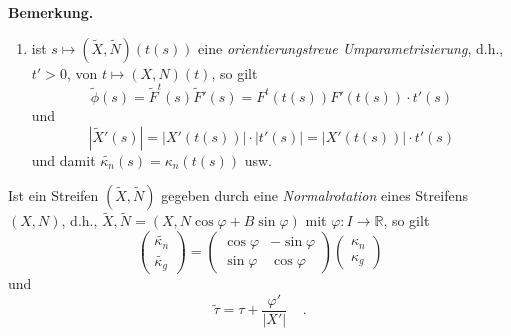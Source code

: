 \documentclass[a4paper,oneside,11pt,DIV=12,parskip=half]{scrartcl}
\newcommand{\R}{\mathbb R}
\newenvironment{note}{\textbf{Bemerkung.} ~~~~}{}
\newenvironment{lemma, definition}{\textbf{Lemma und Definition.} ~~~~}{}
\newenvironment{note, example}{\textbf{Bemerkung und Beispiel.} ~~~~}{}
\newenvironment{note, definition}{\textbf{Bemerkung und Definition.} ~~~~}{}
\begin{document}
\begin{lemma, definition}
\begin{note}
\begin{enumerate}
		\item ist $s \mapsto (\widetilde{X}, \widetilde{N})(t(s))$ eine \textit{orientierungstreue Umparametrisierung}, d.h., $t' >0$, von $t \mapsto (X,N)(t)$, so gilt
		\[\widetilde{\phi}(s) = \widetilde{F}^t(s)\widetilde{F}'(s) = F^t(t(s))F'(t(s))\cdot t'(s) \] und \[ |\widetilde{X}'(s)| = |X'(t(s))|\cdot|t'(s)| =  |X'(t(s))|\cdot t'(s) \] und damit $\widetilde{\kappa_n}(s)= \kappa_n(t(s))$ usw.
	\end{enumerate}
\end{note}

\begin{note, definition}
	Ist ein Streifen $(\widetilde{X},\widetilde{N})$ gegeben durch eine \textit{Normalrotation} eines Streifens $(X,N)$, d.h., $\widetilde{X}, \widetilde{N} = (X,N \cos \varphi + B \sin \varphi)$ mit $\varphi: I \rightarrow \R$, so gilt
	\begin{equation*}
	\begin{pmatrix} 
		\widetilde{\kappa_n}\\
		\widetilde{\kappa_g}
	\end{pmatrix}
	=
	 \begin{pmatrix} 
	 \cos \varphi & - \sin \varphi \\
	 \sin \varphi & \cos \varphi
	 \end{pmatrix}
	 \begin{pmatrix}
	 \kappa_n\\
	 \kappa_g
	 \end{pmatrix}
	\end{equation*} und
	$$\widetilde{\tau} = \tau + \frac{\varphi'}{|X'|} ~~~~~.$$
	
	
\end{note, definition}
	
\end{lemma, definition}
\end{document}
